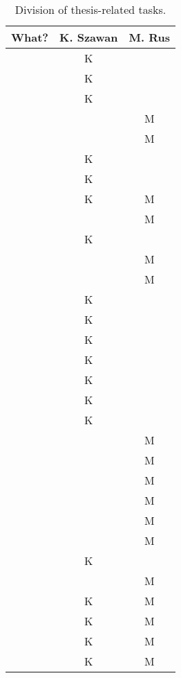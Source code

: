 \begin{table}[h]
	\centering
	\begin{tabular}{l|c|c}
		What? & K. Szawan & M. Rus \\
		\hline
		\Cref{chap:introduction} & K & \\
		\Cref{sec:xmind} & K & \\
		\Cref{sec:android-theory} & K & \\
		\Cref{sec:scala} &  & M \\
		\Cref{sec:akka} &  & M \\
		\Cref{sec:requirements} & K  &  \\
		\Cref{sec:plan}  & K &  \\
		\Cref{subsec:component-android} & K  & M \\
		\Cref{subsec:data-repr}  &   & M \\
		\Cref{subsec:xmind-exchange}  & K  &  \\
		\Cref{subsec:android-akka-comm}  &   & M \\
		\Cref{subsec:subtree-recreation}  &   & M \\		
		\Cref{subsec:choosing-ide} & K  &  \\
		\Cref{subsec:good-idea} & K  &  \\
		\Cref{subsec:android-sbt} & K  &  \\
		\Cref{subsec:drawing} & K  &  \\
		\Cref{subsec:drawing-m} & K  &  \\
		\Cref{subsec:creating-mm} & K  &  \\
		\Cref{subsec:import} & K  &  \\
		\Cref{subsection:akka-actors} &   & M \\
		\Cref{subsection:akka-database} &  & M \\
		\Cref{subsection:akka-spray} &  & M \\
		\Cref{subsection:akka-synchro} &  & M \\
		\Cref{subsec:problem-longpolling} &  & M \\
		\Cref{subsec:problem-tabhost} &  & M \\
		\Cref{subsec:problem-scrollview} & K &  \\
		\Cref{subsec:problem-positioning} &  & M \\
		\Cref{sec:summary-testing} & K  & M \\
		\Cref{sec:summary-how-solve} & K  & M \\
		\Cref{sec:summary-missing} & K  & M \\
		\Cref{sec:summary-future} & K  & M \\
		
	\end{tabular}
	\caption{Division of thesis-related tasks.}
	\label{tab:who-did-docs}
\end{table}
